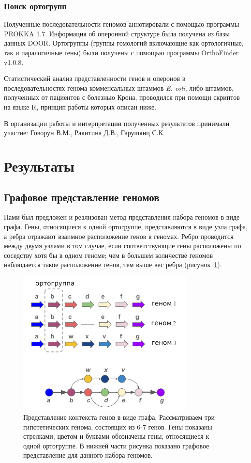 \subsubsection{Поиск ортогрупп}
Полученные последовательности геномов аннотировали с помощью программы PROKKA 1.7. Информация об оперонной структуре была получена из базы данных DOOR. Ортогруппы (группы гомологий включающие как ортологичные, так и паралогичные гены) были получены с помощью программы OrthoFinder v1.0.8. 

Статистический анализ представленности генов и оперонов в последовательностях генома комменсальных штаммов \textit{E. coli}, либо штаммов, полученных от пациентов с болезнью Крона, проводился при помощи скриптов на языке R, принцип работы которых описан ниже.

В организации работы и интерпретации полученных результатов принимали участие: Говорун В.М., Ракитина Д.В., Гарушянц С.К.


\section*{Результаты}

\subsection*{Графовое представление геномов}

Нами был предложен и реализован метод представления набора геномов в виде графа. Гены, относящиеся к одной ортогруппе, представляются в виде узла графа, а ребра отражают взаимное расположение генов в геномах. Ребро проводится между двумя узлами в том случае, если соответствующие гены расположены по соседству хотя бы в одном геноме; чем в большем количестве геномов наблюдается такое расположение генов, тем выше вес ребра (рисунок~\ref{img:scheme}).

\begin{figure}[!ht] 
  \center
    \includegraphics[width=0.8\textwidth]{Dissertation/images/graph/graph_scheme.png}
  \caption{Представление контекста генов в виде графа. Рассматриваем три гипотетических генома, состоящих из 6-7 генов. Гены показаны стрелками, цветом и буквами обозначены гены, относящиеся к одной ортогруппе. В нижней части рисунка показано графовое представление для данного набора геномов.}
  \label{img:scheme} 
\end{figure}

